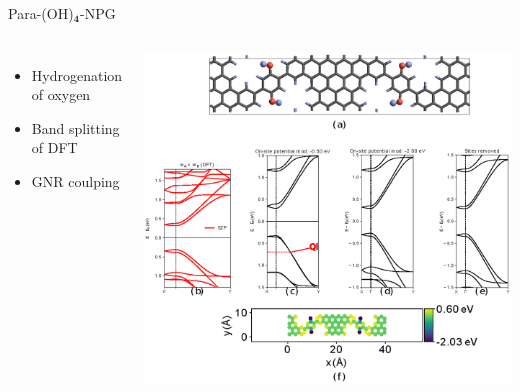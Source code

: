 \documentclass[hyperref={colorlinks=true,urlcolor=blue,linkcolor=.},aspectratio=1610,mathserif]{beamer}
\newcommand*\mathinhead[2]{\texorpdfstring{$\boldsymbol{#1}$}{#2}}
\begin{document}
\begin{frame}{Para-(OH)\mathinhead{_4}{_4}-NPG}
\centering
\begin{columns}[c]
    \begin{itemize}
        \item Hydrogenation of oxygen
        \item Band splitting of DFT
        \item GNR coulping
    \end{itemize}
    \includegraphics[width=\textwidth]{Figures/fig20.eps}
\end{columns}
\end{frame}
\end{document}
